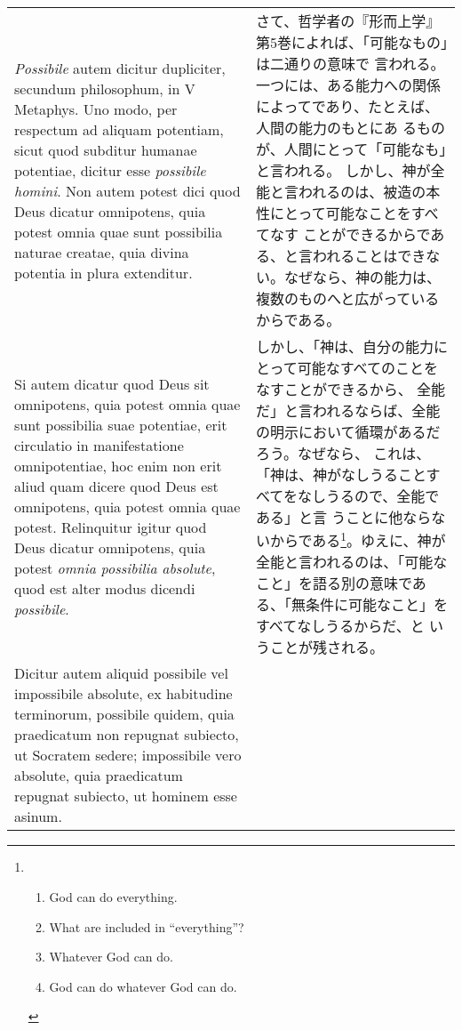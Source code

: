 \documentclass[10pt]{jsarticle} %
\begin{document}
\begin{longtable}{p{21em}p{21em}}
{\itshape Possibile} autem dicitur dupliciter,
secundum philosophum, in V Metaphys. Uno modo, per respectum ad aliquam
potentiam, sicut quod subditur humanae potentiae, dicitur esse {\itshape possibile
homini}. Non autem potest dici quod Deus dicatur omnipotens, quia potest
omnia quae sunt possibilia naturae creatae, quia divina potentia in
plura extenditur. 


&

さて、哲学者の『形而上学』第5巻によれば、「可能なもの」は二通りの意味で
 言われる。
一つには、ある能力への関係によってであり、たとえば、人間の能力のもとにあ
 るものが、人間にとって「可能なも」と言われる。
しかし、神が全能と言われるのは、被造の本性にとって可能なことをすべてなす
 ことができるからである、と言われることはできない。なぜなら、神の能力は、
 複数のものへと広がっているからである。

\\


Si autem dicatur quod Deus sit omnipotens, quia potest
omnia quae sunt possibilia suae potentiae, erit circulatio in
manifestatione omnipotentiae, hoc enim non erit aliud quam dicere quod
Deus est omnipotens, quia potest omnia quae potest. Relinquitur igitur
quod Deus dicatur omnipotens, quia potest {\itshape omnia possibilia absolute},
quod est alter modus dicendi {\itshape possibile}. 


&

しかし、「神は、自分の能力にとって可能なすべてのことをなすことができるから、
 全能だ」と言われるならば、全能の明示において循環があるだろう。なぜなら、
 これは、「神は、神がなしうることすべてをなしうるので、全能である」と言
 うことに他ならないからである\footnote
{\begin{enumerate}
  \item God can do everything.
  \item What are included in ``everything''?
  \item Whatever God can do.
  \item God can do whatever God can do.
 \end{enumerate}
}。ゆえに、神が全能と言われるのは、「可能な
 こと」を語る別の意味である、「無条件に可能なこと」をすべてなしうるからだ、と
 いうことが残される。


\\


Dicitur autem aliquid possibile
vel impossibile absolute, ex habitudine terminorum, possibile quidem,
quia praedicatum non repugnat subiecto, ut Socratem sedere; impossibile
vero absolute, quia praedicatum repugnat subiecto, ut hominem esse
asinum. 




\end{longtable}
\end{document}

